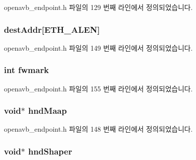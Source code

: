 openavb\+\_\+endpoint.\+h 파일의 129 번째 라인에서 정의되었습니다.

\subsubsection[{\texorpdfstring{dest\+Addr}{destAddr}}]{ dest\+Addr\mbox{[}{\bf E\+T\+H\+\_\+\+A\+L\+EN}\mbox{]}}\hypertarget{structclient_stream__t_a016f2167ae2143dcacd762c10be2f614}{}\label{structclient_stream__t_a016f2167ae2143dcacd762c10be2f614}


openavb\+\_\+endpoint.\+h 파일의 149 번째 라인에서 정의되었습니다.

\subsubsection[{\texorpdfstring{fwmark}{fwmark}}]{\setlength{\rightskip}{0pt plus 5cm}int fwmark}\hypertarget{structclient_stream__t_a730462c5f9401195f3208e5ebbaadba4}{}\label{structclient_stream__t_a730462c5f9401195f3208e5ebbaadba4}


openavb\+\_\+endpoint.\+h 파일의 155 번째 라인에서 정의되었습니다.

\subsubsection[{\texorpdfstring{hnd\+Maap}{hndMaap}}]{\setlength{\rightskip}{0pt plus 5cm}void$\ast$ hnd\+Maap}\hypertarget{structclient_stream__t_a1b2433a27b79ec03bd3274c4c865870e}{}\label{structclient_stream__t_a1b2433a27b79ec03bd3274c4c865870e}


openavb\+\_\+endpoint.\+h 파일의 148 번째 라인에서 정의되었습니다.

\subsubsection[{\texorpdfstring{hnd\+Shaper}{hndShaper}}]{\setlength{\rightskip}{0pt plus 5cm}void$\ast$ hnd\+Shaper}\hypertarget{structclient_stream__t_ac950fbf2d5bb043e6c62591762bbd918}{}\label{structclient_stream__t_ac950fbf2d5bb043e6c62591762bbd918}


